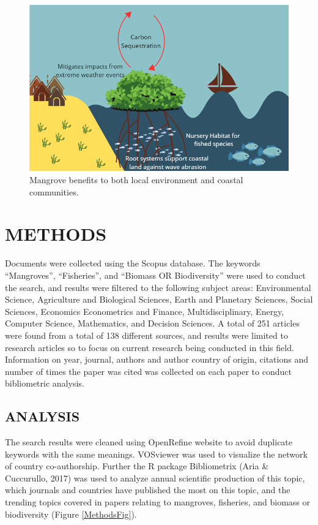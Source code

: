 \documentclass[
  12pt,
]{article}
\begin{document}
\begin{figure}
\includegraphics[width=11.54in]{IntroFig} \caption{Mangrove benefits to both local environment and coastal communities. \label{IntroFig}}\label{fig:IntroFig}
\end{figure}

\section{METHODS}\label{methods}

Documents were collected using the Scopus database. The keywords ``Mangroves'', ``Fisheries'', and ``Biomass OR Biodiversity'' were used to conduct the search, and results were filtered to the following subject areas: Environmental Science, Agriculture and Biological Sciences, Earth and Planetary Sciences, Social Sciences, Economics Econometrics and Finance, Multidisciplinary, Energy, Computer Science, Mathematics, and Decision Sciences. A total of 251 articles were found from a total of 138 different sources, and results were limited to research articles so to focus on current research being conducted in this field. Information on year, journal, authors and author country of origin, citations and number of times the paper was cited was collected on each paper to conduct bibliometric analysis.

\subsection{ANALYSIS}\label{analysis}

The search results were cleaned using OpenRefine website to avoid duplicate keywords with the same meanings. VOSviewer was used to visualize the network of country co-authorship. Further the R package Bibliometrix (Aria \& Cuccurullo, 2017) was used to analyze annual scientific production of this topic, which journals and countries have published the most on this topic, and the trending topics covered in papers relating to mangroves, fisheries, and biomass or biodiversity (Figure \ref{MethodsFig}).
\end{document}
